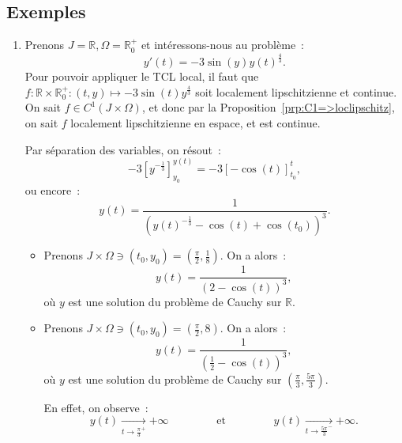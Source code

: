 \documentclass{report}
\theoremstyle{definition}
\theoremstyle{remark}
\numberwithin{equation}{section}
\newcommand{\R}{\mathbb R}
\newcommand{\Rp}{\R^{+}}
\newcommand{\pinfty}{{+\infty}}
\begin{document}
		\subsection{Exemples}
			\begin{enumerate}
				\item Prenons $J = \R, \Omega = \Rp_0$ et intéressons-nous au problème~:
				\begin{equation}
					y'(t) = -3\sin(y)y(t)^{\frac 43}.
				\end{equation}
				Pour pouvoir appliquer le TCL local, il faut que $f : \R \times \Rp_0 : (t, y) \mapsto -3\sin(t)y^{\frac 43}$ soit localement lipschitzienne et
				continue. On sait $f \in C^1(J \times \Omega)$, et donc par la Proposition~\ref{prp:C1=>loclipschitz}, on sait $f$ localement lipschitzienne en
				espace, et est continue.

				Par séparation des variables, on résout~:
				\begin{equation}
					-3\left[y^{-\frac 13}\right]_{y_0}^{y(t)} = -3\left[-\cos(t)\right]_{t_0}^t,
				\end{equation}
				ou encore~:
				\begin{equation}
					y(t) = \frac 1{\left(y(t)^{-\frac 13} - \cos(t) + \cos(t_0)\right)^3}.
				\end{equation}

				\begin{itemize}
					\item Prenons $J \times \Omega \ni (t_0, y_0) = \left(\frac \pi2, \frac 18\right)$. On a alors~:
					\begin{equation}
						y(t) = \frac 1{\left(2-\cos(t)\right)^3},
					\end{equation}
					où $y$ est une solution du problème de Cauchy sur $\R$.

					\item Prenons $J \times \Omega \ni (t_0, y_0) = \left(\frac \pi2, 8\right)$. On a alors~:
					\begin{equation}
						y(t) = \frac 1{\left(\frac 12 - \cos(t)\right)^3},
					\end{equation}
					où $y$ est une solution du problème de Cauchy sur $\left(\frac \pi3, \frac {5\pi}3\right)$.

					En effet, on observe~:
					\begin{equation}
						y(t) \xrightarrow[t \to {\frac \pi3}^+]{} \pinfty\qquad\qquad\text{ et }\qquad\qquad y(t) \xrightarrow[t \to {\frac {5\pi}3}^-]{} \pinfty.
					\end{equation}
				\end{itemize}


\end{enumerate}
\end{document}
